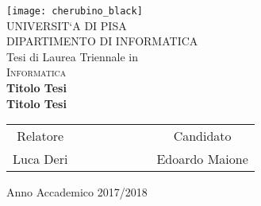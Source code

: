 



\begin{titlepage}
 \begin{center}
     \texttt{[image: cherubino\_black]}\\
     \vspace{1em}
     {\Large \textsc{UNIVERSIT`A DI PISA}}\\
     \vspace{1em}
     {\Large \textsc{DIPARTIMENTO DI INFORMATICA}}\\
     \vspace{2em}
     {\normalsize Tesi di Laurea Triennale in}\\
     \vspace{1em}
     {\Large \textsc{Informatica}}\\
     \vspace{5em}
     {\LARGE \textbf{Titolo Tesi}}\\
     \vspace{1em}
     {\LARGE \textbf{Titolo Tesi}}\\
 \end{center}

\vskip 2.5cm
  \begin{center}
    \begin{tabular}{c c c c c c c c}
      Relatore & & & & & & & Candidato \\[0.2cm]
      \large{Luca Deri} & & & & & & & \large{Edoardo Maione}\\[0.4cm]
    \end{tabular}
  \end{center}

\vskip 2cm
\begin{center}
{\normalsize Anno Accademico 2017/2018}
\end{center}
\end{titlepage}

